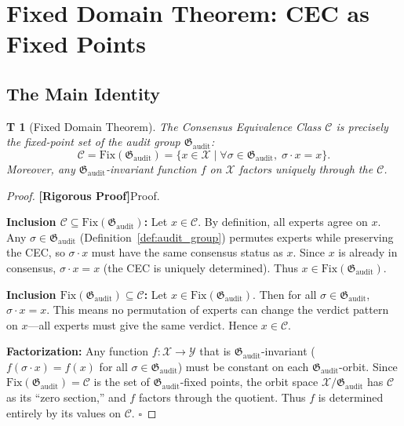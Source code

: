 \documentclass[12pt,a4paper]{article}
\newtheorem{theorem}Theorem[section]
\theoremstyle{remark}
\newcommand{\Fix}{\mathrm{Fix}}
\newcommand{\AuditGrp}{\mathfrak{G}_{\mathrm{audit}}}
\newcommand{\CEC}{\mathcal{C}}
\newcommand{\ClaimSpace}{\mathcal{X}}
\newcommand{\rigorous}{\textnormal{\textbf{[Rigorous Proof]}}}
\begin{document}
\section{Fixed Domain Theorem: CEC as Fixed Points}
\subsection{The Main Identity}
\begin{theorem}[Fixed Domain Theorem]\label{thm:fixed_domain}
The Consensus Equivalence Class \(\CEC\) is precisely the fixed-point set of the audit group \(\AuditGrp\):
\begin{equation}\label{eq:cec_fix}
    \CEC = \Fix(\AuditGrp) = \{x \in \ClaimSpace \mid \forall \sigma \in \AuditGrp,\; \sigma \cdot x = x\}.
\end{equation}
Moreover, any \(\AuditGrp\)-invariant function \(f\) on \(\ClaimSpace\) factors uniquely through the \(\CEC\).
\end{theorem}
\begin{proof}
\rigorous Proof.

\textbf{Inclusion \(\CEC \subseteq \Fix(\AuditGrp)\):} Let \(x \in \CEC\). By definition, all experts agree on \(x\). Any \(\sigma \in \AuditGrp\) (Definition~\ref{def:audit_group}) permutes experts while preserving the CEC, so \(\sigma \cdot x\) must have the same consensus status as \(x\). Since \(x\) is already in consensus, \(\sigma \cdot x = x\) (the CEC is uniquely determined). Thus \(x \in \Fix(\AuditGrp)\).

\textbf{Inclusion \(\Fix(\AuditGrp) \subseteq \CEC\):} Let \(x \in \Fix(\AuditGrp)\). Then for all \(\sigma \in \AuditGrp\), \(\sigma \cdot x = x\). This means no permutation of experts can change the verdict pattern on \(x\)---all experts must give the same verdict. Hence \(x \in \CEC\).

\textbf{Factorization:} Any function \(f: \ClaimSpace \to \mathcal{Y}\) that is \(\AuditGrp\)-invariant (\(f(\sigma \cdot x) = f(x)\) for all \(\sigma \in \AuditGrp\)) must be constant on each \(\AuditGrp\)-orbit. Since \(\Fix(\AuditGrp) = \CEC\) is the set of \(\AuditGrp\)-fixed points, the orbit space \(\ClaimSpace / \AuditGrp\) has \(\CEC\) as its ``zero section,'' and \(f\) factors through the quotient. Thus \(f\) is determined entirely by its values on \(\CEC\). \(\square\)
\end{proof}
\end{document}

